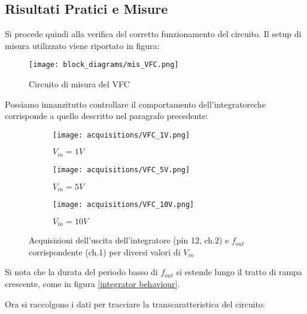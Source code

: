 \subsection*{Risultati Pratici e Misure}


Si procede quindi alla verifica del corretto funzionamento del circuito. Il setup di
misura utilizzato viene riportato in figura:

\begin{figure}[ht]
    \centering
    \texttt{[image: block\_diagrams/mis\_VFC.png]}
    \caption{Circuito di misura del VFC}
    \label{mis_VFC}
\end{figure}

Possiamo innanzitutto controllare il comportamento dell'integratoreche corrisponde
a quello descritto nel paragrafo precedente:

\begin{figure}[ht]
    \centering

    \begin{subfigure}{.5\textwidth}
        \centering
        \texttt{[image: acquisitions/VFC\_1V.png]}
        \caption{$V_{in}=1V$}
        \label{acq_vfc110_1v}
    \end{subfigure}%
    \begin{subfigure}{.5\textwidth}
        \centering
        \texttt{[image: acquisitions/VFC\_5V.png]}
        \caption{$V_{in}=5V$}
        \label{acq_vfc110_5v}
    \end{subfigure}
    \begin{subfigure}{.5\textwidth}
        \centering
        \texttt{[image: acquisitions/VFC\_10V.png]}
        \caption{$V_{in}=10V$}
        \label{acq_vfc110_10v}
    \end{subfigure}

    \caption{Acquisizioni dell'uscita dell'integratore (pin 12, ch.2) e $f_{out}$
        corrispondente (ch.1) per diversi valori di $V_{in}$}
    \label{acq_vfc110}
\end{figure}

Si nota che la durata del periodo basso di $f_{out}$ si estende lungo il tratto di rampa
crescente, come in figura \ref{integrator behaviour}.

Ora si raccolgono i dati per tracciare la transcaratteristica del circuito:

